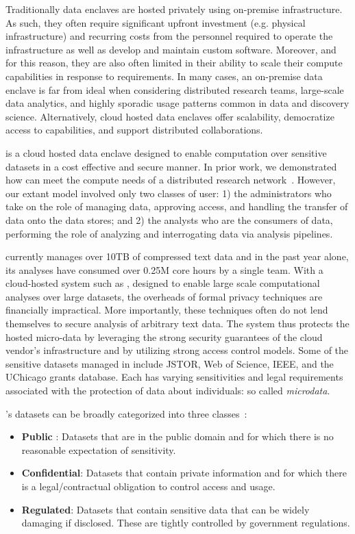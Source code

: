 Traditionally data enclaves are hosted privately using on-premise infrastructure. As
such, they often require significant upfront investment (e.g. physical infrastructure) and recurring costs 
from the personnel required to operate the infrastructure as well as develop and maintain custom software. 
Moreover, and for this reason, they are also often limited in their ability to scale their
compute capabilities in response to requirements. In many cases, an on-premise data enclave is far from ideal
when considering distributed research teams, large-scale data analytics, and highly sporadic
usage patterns common in data and discovery science. Alternatively, cloud hosted data enclaves offer scalability,
democratize access to capabilities, and support distributed collaborations. 

\NAME is a cloud hosted data enclave designed to enable computation over sensitive datasets
in a cost effective and secure manner. 
In prior work, we demonstrated how \NAME can meet the compute needs of a distributed research network~\cite{babuji2016cloud, babuji2016secure}.
However, our extant model involved only two classes of user: 1) the administrators who take on the role of
managing data, approving access, and handling the transfer of data onto the data stores; and 2) the analysts
who are the consumers of data, performing the role of analyzing and interrogating data
via analysis pipelines.

\NAME currently manages over 10TB of compressed text data and in the past year
alone, its analyses have consumed over 0.25M core hours by a single team. With a cloud-hosted system
such as \NAMENS, designed to enable large scale computational analyses over large datasets,
the overheads of formal privacy techniques are financially impractical. More importantly,
these techniques often do not lend themselves to secure analysis of arbitrary text data. 
The system thus protects the hosted micro-data by leveraging the strong security
guarantees of the cloud vendor's infrastructure and by utilizing strong access control
models. Some of the sensitive datasets managed in \NAME include JSTOR, Web of Science, IEEE,
and the UChicago grants database. Each has varying sensitivities and legal requirements associated with the
protection of data about individuals: so called \emph{microdata}.

\NAMENS's datasets can be broadly categorized into three classes~\cite{ist_dataclass}:
\begin{itemize}
\item \textbf{Public} : Datasets that are in the public domain and for which there is no
  reasonable expectation of sensitivity.
\item \textbf{Confidential}: Datasets that contain private information and for which there is a legal/contractual obligation to control access and usage.
\item \textbf {Regulated}: Datasets that contain sensitive data that can be widely damaging if disclosed.
  These are tightly controlled by government regulations.
\end{itemize}

